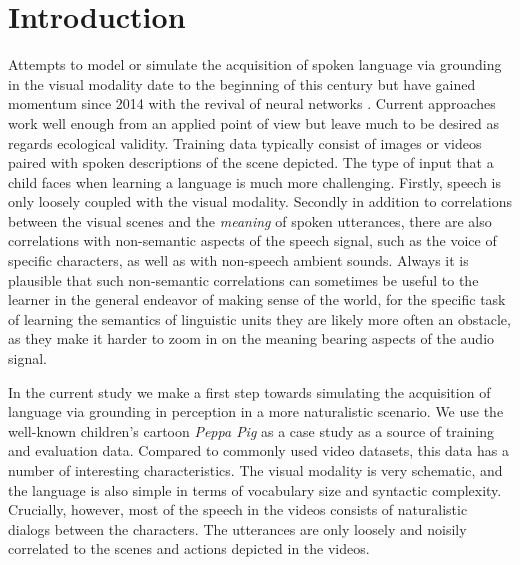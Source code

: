 \section{Introduction}
\label{sec:intro}

Attempts to model or simulate the acquisition of spoken language via
grounding in the visual modality date to the beginning of this century
\citep{roypentland2002learning} but have gained momentum since 2014
with the revival of neural networks
\citep[e.g.][]{synnaeve2014learning,harwath2015deep,
  harwath2016unsupervised,chrupala-etal-2017-representations,alishahi-etal-2017-encoding,harwath2018jointly,Merkx2019,havard2019models,rouditchenko2020avlnet,khorrami_2021,peng2021fastslow}.
Current approaches work well enough from an applied point of view but
leave much to be desired as regards ecological validity. Training data
typically consist of images or videos paired with spoken descriptions
of the scene depicted. The type of input that a child faces when
learning a language is much more challenging.  Firstly, speech is only
loosely coupled with the visual modality. Secondly in addition to
correlations between the visual scenes and the {\it meaning} of spoken
utterances, there are also correlations with non-semantic aspects of
the speech signal, such as the voice of specific characters, as well
as with non-speech ambient sounds. Always it is 
plausible that such
non-semantic correlations can sometimes be useful to the learner in
the general endeavor of making sense of the world, for the specific
task of learning the semantics of linguistic units they are likely more
often an obstacle, as they make it harder to zoom in on the meaning
bearing aspects of the audio signal.

In the current study we make a first step towards simulating the
acquisition of language via grounding in perception in a more naturalistic
scenario.  We use the well-known children's cartoon {\it Peppa Pig} as
a case study as a source of training and evaluation data. Compared to
commonly used video datasets, this data has a number of interesting
characteristics.  The visual modality is very schematic, and the
language is also simple in terms of vocabulary size and syntactic
complexity. Crucially, however, most of the speech in the videos
consists of naturalistic dialogs between the characters. The
utterances are only loosely and noisily correlated to the scenes and
actions depicted in the videos.

